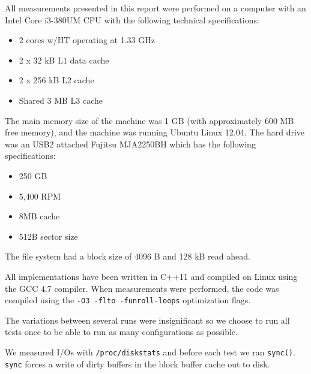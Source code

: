 All measurements presented in this report were performed on a computer
with an Intel Core i3-380UM CPU with the following technical
specifications:
\begin{itemize}
\item 2 cores w/HT operating at 1.33 GHz
\item 2 x 32 kB L1 data cache
\item 2 x 256 kB L2 cache
\item Shared 3 MB L3 cache
\end{itemize}
The main memory size of the machine was 1 GB (with approximately 600 MB free memory), and the machine was running Ubuntu
Linux 12.04. The hard drive was an USB2 attached Fujitsu MJA2250BH which has the following specifications:

\begin{itemize}
\item 250 GB
\item 5,400 RPM
\item 8MB cache
\item 512B sector size
\end{itemize}

The file system had a block size of 4096 B and 128 kB read ahead.

All implementations have been
written in C++11 and compiled on Linux using the GCC 4.7 compiler. When measurements were performed, the
code was compiled using the \texttt{-O3 -flto -funroll-loops}
optimization flags.

The variations between several runs were insignificant so we choose to run all tests once to be able to run as many configurations as possible.

We measured I/Os with \texttt{/proc/diskstats} and before each test we ran \texttt{sync()}. \texttt{sync} forces a write of dirty buffers in the block buffer cache out to disk.

